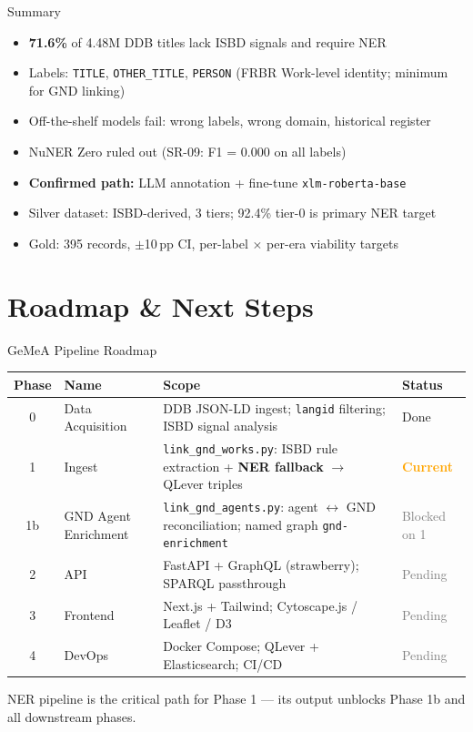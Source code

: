 \documentclass[xcolor,aspectratio=169,compress]{beamer}
\begin{document}
\begin{frame}{Summary}
  \small
  \begin{itemize}\setlength{\itemsep}{3pt}
    \item \textbf{71.6\%} of 4.48M DDB titles lack ISBD signals and require NER
    \item Labels: \texttt{TITLE}, \texttt{OTHER\_TITLE}, \texttt{PERSON} (FRBR Work-level identity; minimum for GND linking)
    \item Off-the-shelf models fail: wrong labels, wrong domain, historical register
    \item NuNER Zero ruled out (SR-09: F1 = 0.000 on all labels)
    \item \textbf{Confirmed path:} LLM annotation + fine-tune \texttt{xlm-roberta-base}
    \item Silver dataset: ISBD-derived, 3 tiers; 92.4\% tier-0 is primary NER target
    \item Gold: 395 records, $\pm$10\,pp CI, per-label $\times$ per-era viability targets
  \end{itemize}
  \normalsize
\end{frame}

\section{Roadmap \& Next Steps}

\begin{frame}{GeMeA Pipeline Roadmap}
  \footnotesize
  \begin{tabular}{clp{6cm}l}
    \toprule
    Phase & Name & Scope & Status \\
    \midrule
    0  & Data Acquisition     & DDB JSON-LD ingest; \texttt{langid} filtering; ISBD signal analysis & \textcolor{green!60!black}{Done} \\
    1  & Ingest               & \texttt{link\_gnd\_works.py}: ISBD rule extraction + \textbf{NER fallback} $\to$ QLever triples & \textcolor{orange}{\textbf{Current}} \\
    1b & GND Agent Enrichment & \texttt{link\_gnd\_agents.py}: agent $\leftrightarrow$ GND reconciliation; named graph \texttt{gnd-enrichment} & \textcolor{gray}{Blocked on 1} \\
    2  & API                  & FastAPI + GraphQL (strawberry); SPARQL passthrough & \textcolor{gray}{Pending} \\
    3  & Frontend             & Next.js + Tailwind; Cytoscape.js / Leaflet / D3 & \textcolor{gray}{Pending} \\
    4  & DevOps               & Docker Compose; QLever + Elasticsearch; CI/CD & \textcolor{gray}{Pending} \\
    \bottomrule
  \end{tabular}
  \smallskip
  \normalsize
  \begin{block}{}
    \small NER pipeline is the critical path for Phase 1 --- its output unblocks Phase 1b and all downstream phases.
  \end{block}
\end{frame}
\end{document}
